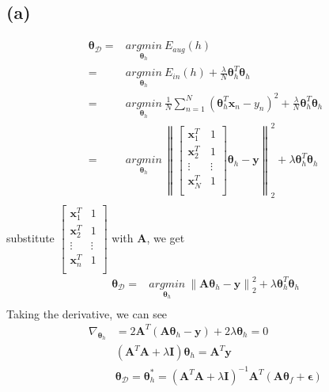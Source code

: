 \documentclass[11pt]{article}
\begin{document}
\subsection*{(a)}
\begin{equation}
\begin{split}
\pmb{\theta}_\mathcal{D}=&\underset{\pmb{\theta}_h}{argmin}\ E_{aug}(h)\\
=&\underset{\pmb{\theta}_h}{argmin}\ E_{in}(h)+\frac{\lambda}{N}\pmb{\theta}^T_h\pmb{\theta}_h\\
=&\underset{\pmb{\theta}_h}{argmin}\ \frac{1}{N}\sum_{n=1}^{N}(\pmb{\theta}_h^T\pmb{x}_n-y_n)^2	+\frac{\lambda}{N}\pmb{\theta}^T_h\pmb{\theta}_h\\
=&\underset{\pmb{\theta}_h}{argmin}\ 
\left\lVert\begin{bmatrix}
\pmb{x}_1^T & 1\\
\pmb{x}_2^T & 1\\
\vdots & \vdots\\
\pmb{x}_N^T & 1\\
\end{bmatrix}
\pmb{\theta}_h - \pmb{y}\right\rVert^2_2
+\lambda\pmb{\theta}^T_h\pmb{\theta}_h\\
\end{split}
\end{equation}
substitute $\begin{bmatrix}
\pmb{x}_1^T & 1\\
\pmb{x}_2^T & 1\\
\vdots & \vdots\\
\pmb{x}_n^T & 1\\
\end{bmatrix}$
with $\pmb{A}$, we get
\begin{equation}
\begin{split}
\pmb{\theta}_\mathcal{D}=&\underset{\pmb{\theta}_h}{argmin}\ \left\lVert\pmb{A}\pmb{\theta}_h - \pmb{y}\right\rVert^2_2
+\lambda\pmb{\theta}^T_h\pmb{\theta}_h\\
\end{split}
\end{equation}
Taking the derivative, we can see
\begin{equation}
\begin{split}
\nabla_{\pmb{\theta}_h} &= 2\pmb{A}^T(\pmb{A\theta}_h-\pmb{y})+2\lambda\pmb{\theta}_h = 0\\
&(\pmb{A}^T\pmb{A}+\lambda\pmb{I})\pmb{\theta}_h = \pmb{A}^T\pmb{y}\\
&\pmb{\theta}_{\mathcal{D}}=\pmb{\theta}_h^* = (\pmb{A}^T\pmb{A}+\lambda\pmb{I})^{-1}\pmb{A}^T(\pmb{A}\pmb{\theta}_f+\pmb{\epsilon})
\end{split}
\end{equation}
\end{document}

